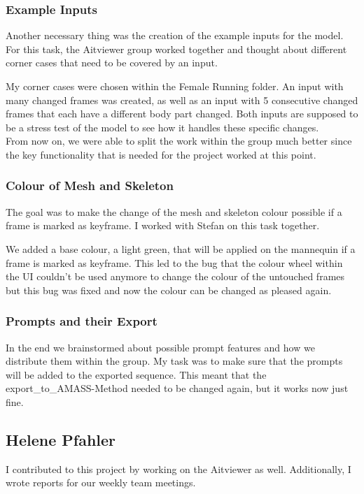 \documentclass[a4paper]{scrartcl}
\begin{document}
\subsubsection*{Example Inputs}
Another necessary thing was the creation of the example inputs for the model. For this task, the Aitviewer group worked together and thought about different corner cases that need to be covered by an input. 

My corner cases were chosen within the Female Running folder. An input with many changed frames was created, as well as an input with 5 consecutive changed frames that each have a different body part changed. Both inputs are supposed to be a stress test of the model to see how it handles these specific changes.\\

From now on, we were able to split the work within the group much better since the key functionality that is needed for the project worked at this point. 

\subsubsection*{Colour of Mesh and Skeleton}
The goal was to make the change of the mesh and skeleton colour possible if a frame is marked as keyframe. I worked with Stefan on this task together.

We added a base colour, a light green, that will be applied on the mannequin if a frame is marked as keyframe. This led to the bug that the colour wheel within the UI couldn't be used anymore to change the colour of the untouched frames but this bug was fixed and now the colour can be changed as pleased again.

\subsubsection*{Prompts and their Export}
In the end we brainstormed about possible prompt features and how we distribute them within the group. My task was to make sure that the prompts will be added to the exported sequence. This meant that the export\_to\_AMASS-Method needed to be changed again, but it works now just fine.  


\subsection*{Helene Pfahler}
I contributed to this project by working on the Aitviewer as well. Additionally, I wrote reports for our weekly team meetings.
\end{document}
